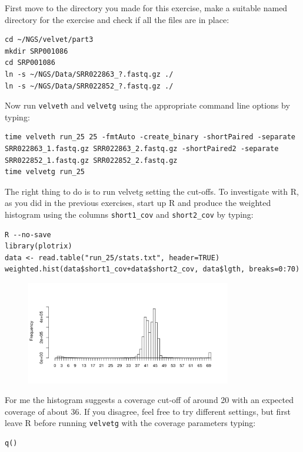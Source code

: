 \begin{steps}
First move to the directory you made for this exercise, make a suitable named
directory for the exercise and check if all the files are in place:
\begin{lstlisting}
cd ~/NGS/velvet/part3
mkdir SRP001086
cd SRP001086
ln -s ~/NGS/Data/SRR022863_?.fastq.gz ./
ln -s ~/NGS/Data/SRR022852_?.fastq.gz ./
\end{lstlisting}

Now run \texttt{velveth} and \texttt{velvetg} using the appropriate command line
options by typing:
\begin{lstlisting}
time velveth run_25 25 -fmtAuto -create_binary -shortPaired -separate SRR022863_1.fastq.gz SRR022863_2.fastq.gz -shortPaired2 -separate SRR022852_1.fastq.gz SRR022852_2.fastq.gz
time velvetg run_25
\end{lstlisting}

The right thing to do is to run velvetg setting the cut-offs. To investigate
with R, as you did in the previous exercises, start up R and produce the
weighted histogram using the columns \texttt{short1\_cov} and
\texttt{short2\_cov} by typing:
\begin{lstlisting}
R --no-save
library(plotrix) 
data <- read.table("run_25/stats.txt", header=TRUE) 
weighted.hist(data$short1_cov+data$short2_cov, data$lgth, breaks=0:70)
\end{lstlisting}

\begin{figure}[H]
\centering
\includegraphics[width=0.8\textwidth]{de_novo/velvet/velvet_Rplot004.png}
\label{fig:velvet_Rplot004}
\end{figure}

For me the histogram suggests a coverage cut-off of around 20
with an expected coverage of about 36. If you disagree, feel free to try
different settings, but first leave R before running \texttt{velvetg} with the coverage
parameters typing:
\begin{lstlisting}
q()


\end{lstlisting}
\end{steps}
